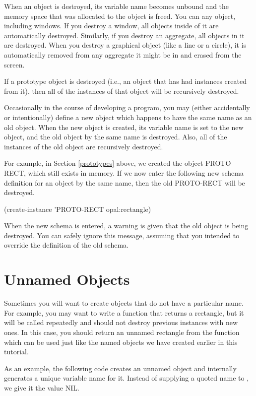 When an object is destroyed, its variable name becomes unbound and the
memory space that was allocated to the object is freed.  You can
 any object, including windows.  If you destroy a window,
all objects inside of it are automatically destroyed.  Similarly, if
you destroy an aggregate, all objects in it are destroyed.  When you
destroy a graphical object (like a line or a circle), it is
automatically removed from any aggregate it might be in and erased
from the screen.

If a prototype object is destroyed (i.e., an object that has had
instances created from it), then all of the instances of that object
will be recursively destroyed.

Occasionally in the course of developing a program, you may (either
accidentally or intentionally) define a new object which happens to
have the same name as an old object.  When the new object is created,
its variable name is set to the new object, and the old object by the
same name is destroyed.  Also, all of the instances of the old object
are recursively destroyed.

For example, in Section \ref{prototypes} above, we created the object
PROTO-RECT, which still exists in memory.  If we now enter the
following new schema definition for an object by the same name, then
the old PROTO-RECT will be destroyed.

\begin{programexample}
(create-instance 'PROTO-RECT opal:rectangle)
\end{programexample}

When the new schema is entered, a warning is given that the old object
is being destroyed.  You can safely ignore this message, assuming that
you intended to override the definition of the old schema.


\section{Unnamed Objects}
\label{unnamed-objects}

Sometimes you will want to create objects that do not have a
particular name.  For example, you may want to write a function that
returns a rectangle, but it will be called repeatedly and should not destroy
previous instances with new ones.  In this case, you should return an
unnamed rectangle from the function which can be used just like the
named objects we have created earlier in this tutorial.

As an example, the following code creates an
unnamed object and internally generates a unique variable name for it.
Instead of supplying a quoted name to , we give it
the value NIL.


